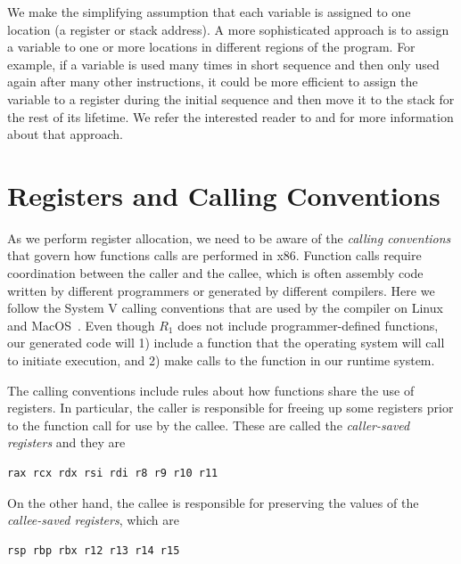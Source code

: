 \documentclass[11pt]{book}
\begin{document}
We make the simplifying assumption that each variable is assigned to
one location (a register or stack address). A more sophisticated
approach is to assign a variable to one or more locations in different
regions of the program.  For example, if a variable is used many times
in short sequence and then only used again after many other
instructions, it could be more efficient to assign the variable to a
register during the initial sequence and then move it to the stack for
the rest of its lifetime. We refer the interested reader to
\citet{Cooper:1998ly} and \citet{Cooper:2011aa} for more information
about that approach.


\section{Registers and Calling Conventions}
\label{sec:calling-conventions}

As we perform register allocation, we need to be aware of the
\emph{calling conventions}  that govern how
functions calls are performed in x86. Function calls require
coordination between the caller and the callee, which is often
assembly code written by different programmers or generated by
different compilers. Here we follow the System V calling conventions
that are used by the  compiler on Linux and
MacOS~\citep{Bryant:2005aa,Matz:2013aa}.
%
Even though $R_1$ does not include programmer-defined functions, our
generated code will 1) include a  function that the
operating system will call to initiate execution, and 2) make calls to
the  function in our runtime system.

The calling conventions include rules about how functions share the
use of registers. In particular, the caller is responsible for freeing
up some registers prior to the function call for use by the callee.
These are called the \emph{caller-saved registers}
and they are
\begin{lstlisting}
rax rcx rdx rsi rdi r8 r9 r10 r11
\end{lstlisting}
On the other hand, the callee is responsible for preserving the values
of the \emph{callee-saved registers}, 
which are
\begin{lstlisting}
rsp rbp rbx r12 r13 r14 r15
\end{lstlisting}
\end{document}
